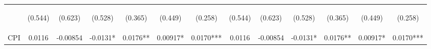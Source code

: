 \documentclass[]{article}
\begin{document}
\begin{center}
\begin{tabular}{lcccccccccccc}
\vspace{4pt} & \begin{footnotesize}(0.544)\end{footnotesize} & \begin{footnotesize}(0.623)\end{footnotesize} & \begin{footnotesize}(0.528)\end{footnotesize} & \begin{footnotesize}(0.365)\end{footnotesize} & \begin{footnotesize}(0.449)\end{footnotesize} & \begin{footnotesize}(0.258)\end{footnotesize} & \begin{footnotesize}(0.544)\end{footnotesize} & \begin{footnotesize}(0.623)\end{footnotesize} & \begin{footnotesize}(0.528)\end{footnotesize} & \begin{footnotesize}(0.365)\end{footnotesize} & \begin{footnotesize}(0.449)\end{footnotesize} & \begin{footnotesize}(0.258)\end{footnotesize} \\
CPI & 0.0116 & -0.00854 & -0.0131* & 0.0176** & 0.00917* & 0.0170*** & 0.0116 & -0.00854 & -0.0131* & 0.0176** & 0.00917* & 0.0170*** \\

\end{tabular}
\end{center}
\end{document}
